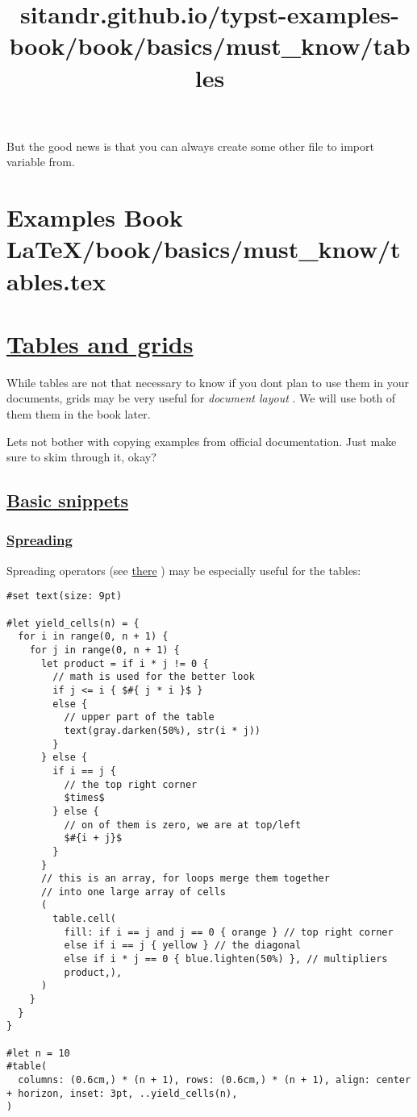 But the good news is that you can always create some other file to
import variable from.


\section{Examples Book LaTeX/book/basics/must_know/tables.tex}
\title{sitandr.github.io/typst-examples-book/book/basics/must_know/tables}

\section{\texorpdfstring{\hyperref[tables-and-grids]{Tables and
grids}}{Tables and grids}}\label{tables-and-grids}

While tables are not that necessary to know if you don\textquotesingle t
plan to use them in your documents, grids may be very useful for
\emph{document layout} . We will use both of them them in the book
later.

Let\textquotesingle s not bother with copying examples from official
documentation. Just make sure to skim through it, okay?

\subsection{\texorpdfstring{\hyperref[basic-snippets]{Basic
snippets}}{Basic snippets}}\label{basic-snippets}

\subsubsection{\texorpdfstring{\hyperref[spreading]{Spreading}}{Spreading}}\label{spreading}

Spreading operators (see \href{../scripting/arguments.html}{there} ) may
be especially useful for the tables:

\begin{verbatim}
#set text(size: 9pt)

#let yield_cells(n) = {
  for i in range(0, n + 1) {
    for j in range(0, n + 1) {
      let product = if i * j != 0 {
        // math is used for the better look 
        if j <= i { $#{ j * i }$ } 
        else {
          // upper part of the table
          text(gray.darken(50%), str(i * j))
        }
      } else {
        if i == j {
          // the top right corner 
          $times$
        } else {
          // on of them is zero, we are at top/left
          $#{i + j}$
        }
      }
      // this is an array, for loops merge them together
      // into one large array of cells
      (
        table.cell(
          fill: if i == j and j == 0 { orange } // top right corner
          else if i == j { yellow } // the diagonal
          else if i * j == 0 { blue.lighten(50%) }, // multipliers
          product,),
      )
    }
  }
}

#let n = 10
#table(
  columns: (0.6cm,) * (n + 1), rows: (0.6cm,) * (n + 1), align: center + horizon, inset: 3pt, ..yield_cells(n),
)
\end{verbatim}

